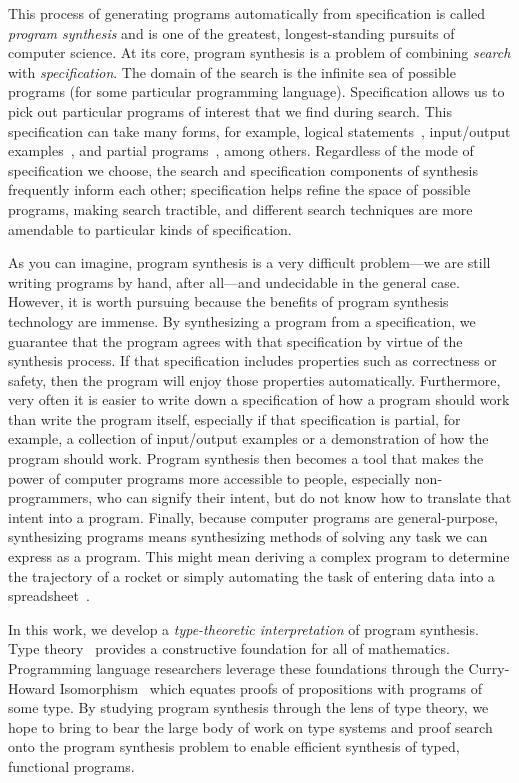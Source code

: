 This process of generating programs automatically from specification is called \emph{program synthesis} and is one of the greatest, longest-standing pursuits of computer science.
At its core, program synthesis is a problem of combining \emph{search} with \emph{specification}.
The domain of the search is the infinite sea of possible programs (for some particular programming language).
Specification allows us to pick out particular programs of interest that we find during search.
This specification can take many forms, for example, logical statements~\citep{green-ijcai-1969, manna-tse-1979}, input/output examples~\citep{summers-popl-1976, kitzelmann-thesis-2010, albarghouthi-cav-2013, feser-pldi-2015}, and partial programs~\citep{solar-lezama-thesis-2008, alur-fmcad-2013, singh-pldi-2013}, among others.
Regardless of the mode of specification we choose, the search and specification components of synthesis frequently inform each other; specification helps refine the space of possible programs, making search tractible, and different search techniques are more amendable to particular kinds of specification.

As you can imagine, program synthesis is a very difficult problem---we are still writing programs by hand, after all---and undecidable in the general case.
However, it is worth pursuing because the benefits of program synthesis technology are immense.
By synthesizing a program from a specification, we guarantee that the program agrees with that specification by virtue of the synthesis process.
If that specification includes properties such as correctness or safety, then the program will enjoy those properties automatically.
Furthermore, very often it is easier to write down a specification of how a program should work than write the program itself, especially if that specification is partial, for example, a collection of input/output examples or a demonstration of how the program should work.
Program synthesis then becomes a tool that makes the power of computer programs more accessible to people, especially non-programmers, who can signify their intent, but do not know how to translate that intent into a program.
Finally, because computer programs are general-purpose, synthesizing programs means synthesizing methods of solving any task we can express as a program.
This might mean deriving a complex program to determine the trajectory of a rocket or simply automating the task of entering data into a spreadsheet~\citep{gulwani-popl-2011}.

In this work, we develop a \emph{type-theoretic interpretation} of program synthesis.
Type theory~\citep{martin-lof-1984} provides a constructive foundation for all of mathematics.
Programming language researchers leverage these foundations through the Curry-Howard Isomorphism~\citep{william-curry-1980} which equates proofs of propositions with programs of some type.
By studying program synthesis through the lens of type theory, we hope to bring to bear the large body of work on type systems and proof search onto the program synthesis problem to enable efficient synthesis of typed, functional programs.

